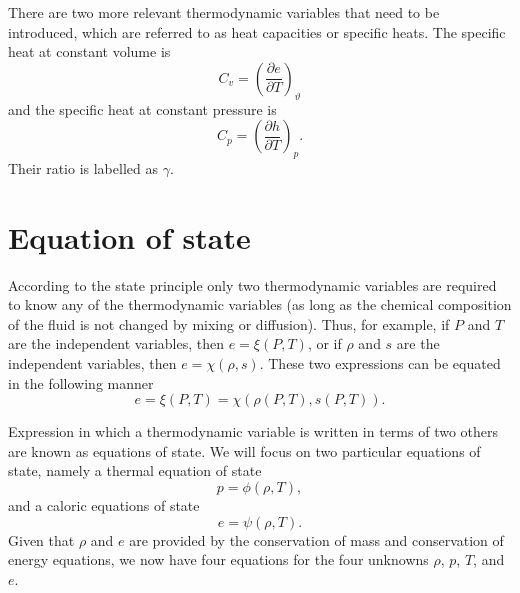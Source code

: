 \documentclass[oneside,a4paper,11pt]{report}
\begin{document}
There are two more relevant thermodynamic variables that need to be introduced, which are referred to as heat capacities or specific heats. The specific heat at constant volume is
\begin{equation}
    C_v = \left( \frac{\partial e}{\partial T} \right)_\vartheta
\end{equation}
and the specific heat at constant pressure is
\begin{equation}
    C_p = \left ( \frac{\partial h}{\partial T} \right)_p.
\end{equation}
Their ratio is labelled as $\gamma$.

\section{Equation of state}
\label{sec:eos}
According to the state principle only two thermodynamic variables are required to know any of the thermodynamic variables (as long as the chemical composition of the fluid is not changed by mixing or diffusion). Thus, for example, if $P$ and $T$ are the independent variables, then $e = \xi(P,T)$, or if $\rho$ and $s$ are the independent variables, then $e = \chi(\rho,s)$. These two expressions can be equated in the following manner
\begin{equation}
\label{eq:state_principle}
    e = \xi(P,T) = \chi(\rho(P,T), s(P,T)).
\end{equation}

Expression in which a thermodynamic variable is written in terms of two others are known as equations of state. We will focus on two particular equations of state, namely a thermal equation of state
\begin{equation}
\label{eq:thermal_eos}
    p = \phi(\rho,T),
\end{equation}
and a caloric equations of state 
\begin{equation}
\label{eq:caloric_eos}
    e =\psi(\rho,T).
\end{equation}
Given that $\rho$ and $e$ are provided by the conservation of mass and conservation of energy equations, we now have four equations for the four unknowns $\rho$, $p$, $T$, and $e$.

\end{document}
